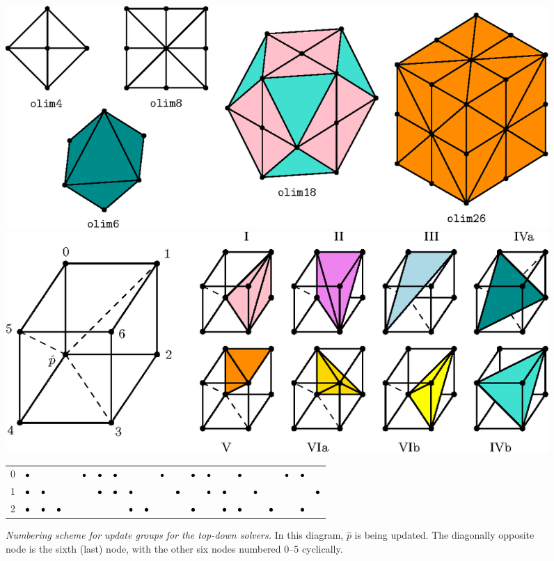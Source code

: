 \documentclass[smallcondensed]{svjour3}
\begin{document}
\begin{figure}
  \centering
  \includegraphics[width=0.95\linewidth]{neighborhoods.eps}
  \caption{\emph{Neighborhoods for the \emph{top-down} family of algorithms.}
    Algorithms \texttt{olim4} and \texttt{olim8} are 2D solvers and
    the rest are 3D solvers. The color coding of tetrahedron updates
    is the same for this figure and figure \ref{fig:octant-numbering}
    below.}\label{fig:neighborhoods}%
  \includegraphics[width=0.95\linewidth]{simplex-groups.eps}
  \caption{\emph{Numbering scheme for update groups for the \emph{top-down} solvers.} In this
    diagram, $\hat{p}$ is being updated. The diagonally opposite node
    is the sixth (last) node, with the other six nodes numbered 0--5
    cyclically.}\label{fig:octant-numbering}
  { \footnotesize
    \vspace{1em}
    \begin{tabular}{c|cccccc|cccccc|cccccc|cc}
      0 & $\bullet$ & & & & $\bullet$ & $\bullet$ & $\bullet$ & & & $\bullet$ & & $\bullet$ & $\bullet$ & & $\bullet$ & & & $\bullet$ & $\bullet$ & \\
      1 & $\bullet$ & $\bullet$ & & & & $\bullet$ & $\bullet$ & $\bullet$ & & & $\bullet$ & & $\bullet$ & $\bullet$ & & $\bullet$ & & & & $\bullet$ \\
      2 & $\bullet$ & $\bullet$ & $\bullet$ & & & & & $\bullet$ & $\bullet$ & & & $\bullet$ & & $\bullet$ & $\bullet$ & & $\bullet$ & & $\bullet$ & \\

\end{tabular}}
\end{figure}
\end{document}
